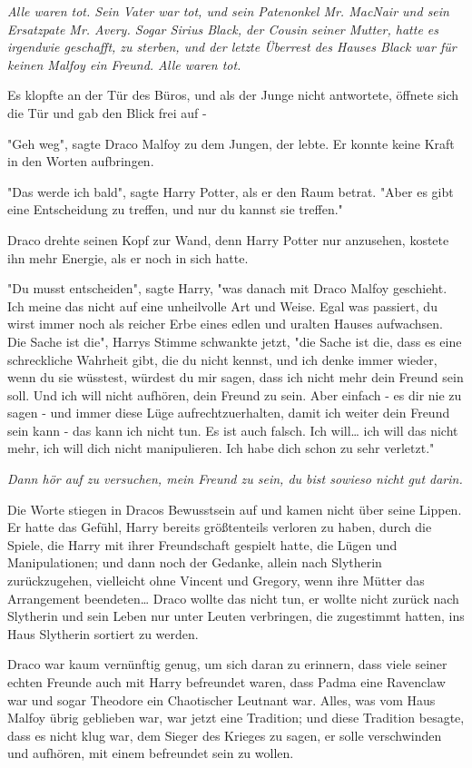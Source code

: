 {\emph{Alle waren tot. Sein Vater war tot, und sein Patenonkel Mr. MacNair und sein Ersatzpate Mr. Avery. Sogar Sirius Black, der Cousin seiner Mutter, hatte es irgendwie geschafft, zu sterben, und der letzte Überrest des Hauses Black war für keinen Malfoy ein Freund. Alle waren tot.}

Es klopfte an der Tür des Büros, und als der Junge nicht antwortete, öffnete sich die Tür und gab den Blick frei auf -

"Geh weg", sagte Draco Malfoy zu dem Jungen, der lebte. Er konnte keine Kraft in den Worten aufbringen.

"Das werde ich bald", sagte Harry Potter, als er den Raum betrat. "Aber es gibt eine Entscheidung zu treffen, und nur du kannst sie treffen."

Draco drehte seinen Kopf zur Wand, denn Harry Potter nur anzusehen, kostete ihn mehr Energie, als er noch in sich hatte.

"Du musst entscheiden", sagte Harry, "was danach mit Draco Malfoy geschieht. Ich meine das nicht auf eine unheilvolle Art und Weise. Egal was passiert, du wirst immer noch als reicher Erbe eines edlen und uralten Hauses aufwachsen. Die Sache ist die", Harrys Stimme schwankte jetzt, "die Sache ist die, dass es eine schreckliche Wahrheit gibt, die du nicht kennst, und ich denke immer wieder, wenn du sie wüsstest, würdest du mir sagen, dass ich nicht mehr dein Freund sein soll. Und ich will nicht aufhören, dein Freund zu sein. Aber einfach - es dir nie zu sagen - und immer diese Lüge aufrechtzuerhalten, damit ich weiter dein Freund sein kann - das kann ich nicht tun. Es ist auch falsch. Ich will… ich will das nicht mehr, ich will dich nicht manipulieren. Ich habe dich schon zu sehr verletzt."

\emph{Dann hör auf zu versuchen, mein Freund zu sein, du bist sowieso nicht gut darin.}

Die Worte stiegen in Dracos Bewusstsein auf und kamen nicht über seine Lippen. Er hatte das Gefühl, Harry bereits größtenteils verloren zu haben, durch die Spiele, die Harry mit ihrer Freundschaft gespielt hatte, die Lügen und Manipulationen; und dann noch der Gedanke, allein nach Slytherin zurückzugehen, vielleicht ohne Vincent und Gregory, wenn ihre Mütter das Arrangement beendeten… Draco wollte das nicht tun, er wollte nicht zurück nach Slytherin und sein Leben nur unter Leuten verbringen, die zugestimmt hatten, ins Haus Slytherin sortiert zu werden.

Draco war kaum vernünftig genug, um sich daran zu erinnern, dass viele seiner echten Freunde auch mit Harry befreundet waren, dass Padma eine Ravenclaw war und sogar Theodore ein Chaotischer Leutnant war. Alles, was vom Haus Malfoy übrig geblieben war, war jetzt eine Tradition; und diese Tradition besagte, dass es nicht klug war, dem Sieger des Krieges zu sagen, er solle verschwinden und aufhören, mit einem befreundet sein zu wollen.

}
